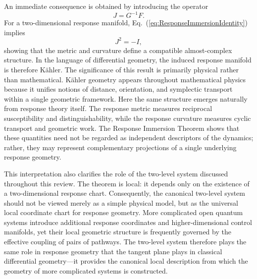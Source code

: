 An immediate consequence is obtained by introducing the operator
%
\begin{equation}
J
=
G^{-1}F.
\end{equation}
%
For a two-dimensional response manifold,
Eq.~(\ref{eq:ResponseImmersionIdentity}) implies
%
\begin{equation}
J^2=-I,
\end{equation}
%
showing that the metric and curvature define a compatible
almost-complex structure. In the language of differential
geometry, the induced response manifold is therefore K\"ahler.
The significance of this result is primarily physical rather than
mathematical. K\"ahler geometry appears throughout mathematical
physics because it unifies notions of distance, orientation, and
symplectic transport within a single geometric framework. Here the
same structure emerges naturally from response theory itself. The
response metric measures reciprocal susceptibility and
distinguishability, while the response curvature measures cyclic
transport and geometric work. The Response Immersion Theorem shows
that these quantities need not be regarded as independent
descriptors of the dynamics; rather, they may represent
complementary projections of a single underlying response
geometry.

This interpretation also clarifies the role of the two-level
system discussed throughout this review. The theorem is local: it
depends only on the existence of a two-dimensional response chart.
Consequently, the canonical two-level system should not be viewed
merely as a simple physical model, but as the universal local
coordinate chart for response geometry. More complicated open
quantum systems introduce additional response coordinates and
higher-dimensional control manifolds, yet their local geometric
structure is frequently governed by the effective coupling of
pairs of pathways. The two-level system therefore plays the same
role in response geometry that the tangent plane plays in
classical differential geometry---it provides the canonical local
description from which the geometry of more complicated systems is
constructed.

